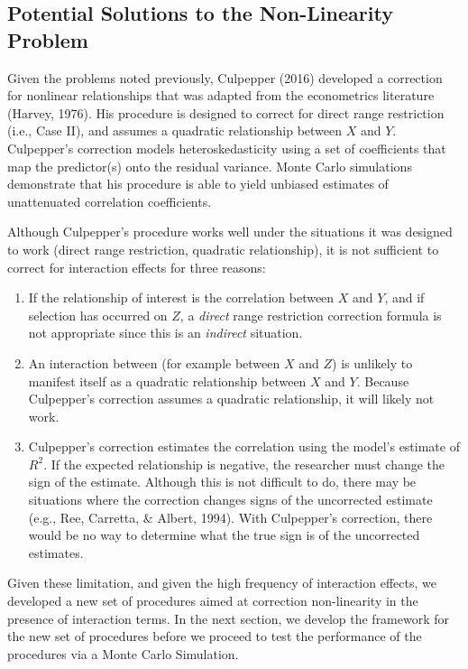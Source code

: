 \documentclass[doc, babel,english]{apa}%
\begin{document}
\subsection{Potential Solutions to the Non-Linearity Problem}

Given the problems noted previously, Culpepper (2016) developed a correction for nonlinear relationships that was adapted from the econometrics literature (Harvey, 1976). His procedure is designed to correct for direct range restriction (i.e., Case II), and assumes a quadratic relationship between $X$ and $Y.$ Culpepper's correction models heteroskedasticity using a set of coefficients that map the predictor(s) onto the residual variance. Monte Carlo simulations demonstrate that his procedure is able to yield unbiased estimates of unattenuated correlation coefficients. 

Although Culpepper's procedure works well under the situations it was designed to work (direct range restriction, quadratic relationship), it is not sufficient to correct for interaction effects for three reasons:
\begin{enumerate}
\item If the relationship of interest is the correlation between $X$ and $Y$, and if selection has occurred on $Z$, a \emph{direct} range restriction correction formula is not appropriate since this is an \emph{indirect} situation. 
\item An interaction between (for example between $X$ and $Z$) is unlikely to manifest itself as a quadratic relationship between $X$ and $Y$. Because Culpepper's correction assumes a quadratic relationship, it will likely not work. 
\item Culpepper's correction estimates the correlation using the model's estimate of $R^2$. If the expected relationship is negative, the researcher must change the sign of the estimate. Although this is not difficult to do, there may be situations where the correction changes signs of the uncorrected estimate (e.g., Ree, Carretta, \& Albert, 1994). With Culpepper's correction, there would be no way to determine what the true sign is of the uncorrected estimates. 
\end{enumerate}

Given these limitation, and given the high frequency of interaction effects, we developed a new set of procedures aimed at correction non-linearity in the presence of interaction terms. In the next section, we develop the framework for the new set of procedures before we proceed to test the performance of the procedures via a Monte Carlo Simulation. 
\end{document}
